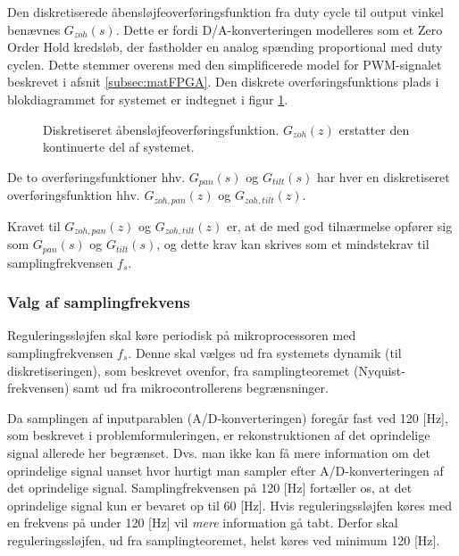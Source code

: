 Den diskretiserede åbensløjfeoverføringsfunktion fra duty cycle til output vinkel
benævnes \(G_{zoh}\left(s\right)\). Dette er fordi D/A-konverteringen modelleres som et Zero Order Hold kredsløb,
der fastholder en analog spænding proportional med duty cyclen. Dette stemmer overens med den simplificerede
model for PWM-signalet beskrevet i afsnit \ref{subsec:matFPGA}.
Den diskrete overføringsfunktions plads i blokdiagrammet for systemet
er indtegnet i figur \ref{fig:digitalkontroller3}.
\begin{figure}[!th]
\centering
\begin{tikzpicture}[auto, node distance=2.6cm,>=latex']

\end{tikzpicture}
\caption[Diskretiseret åbensløjfeoverføringsfunktion]
		{Diskretiseret åbensløjfeoverføringsfunktion.
		\(G_{zoh}\left(z\right)\) erstatter den kontinuerte del af systemet.}
\label{fig:digitalkontroller3}
\end{figure}
De to overføringsfunktioner hhv. \(G_{pan}\left(s\right)\) og \(G_{tilt}\left(s\right)\)
har hver en diskretiseret overføringsfunktion hhv. \(G_{zoh,pan}\left(z\right)\) og \(G_{zoh,tilt}\left(z\right)\).

Kravet til \(G_{zoh,pan}\left(z\right)\) og \(G_{zoh,tilt}\left(z\right)\) er, at de
med god tilnærmelse opfører sig som \(G_{pan}\left(s\right)\) og \(G_{tilt}\left(s\right)\),
og dette krav kan skrives som et mindstekrav til samplingfrekvensen \(f_s\).

\subsubsection{Valg af samplingfrekvens}\label{subsec:choosefs}
Reguleringssløjfen skal køre periodisk på mikroprocessoren
med samplingfrekvensen \(f_s\). Denne skal vælges
ud fra systemets dynamik (til diskretiseringen), som beskrevet ovenfor,
fra samplingteoremet (Nyquist-frekvensen) samt ud fra
mikrocontrollerens begrænsninger.

Da samplingen af inputparablen (A/D-konverteringen) foregår fast ved 120 [Hz],
som beskrevet i problemformuleringen, er rekonstruktionen
af det oprindelige signal allerede her begrænset. Dvs. man
ikke kan få mere information om det oprindelige signal
uanset hvor hurtigt man sampler efter A/D-konverteringen af
det oprindelige signal.
Samplingfrekvensen på 120 [Hz] fortæller os,
at det oprindelige signal kun er bevaret op til 60 [Hz].
Hvis reguleringssløjfen køres med en frekvens på under 120 [Hz]
vil \textit{mere} information gå tabt.
Derfor skal reguleringssløjfen, ud fra samplingteoremet, helst køres
ved minimum 120 [Hz].

